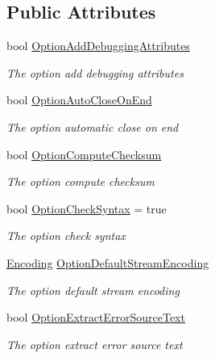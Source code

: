 \subsection*{Public Attributes}
\begin{DoxyCompactItemize}
\item 
bool \hyperlink{class_html_agility_pack_1_1_html_document_a2cf668dcda23a98c29c85163a4358263}{Option\+Add\+Debugging\+Attributes}
\begin{DoxyCompactList}\small\item\em The option add debugging attributes \end{DoxyCompactList}\item 
bool \hyperlink{class_html_agility_pack_1_1_html_document_a40268a813d669a6b004b542840f262c4}{Option\+Auto\+Close\+On\+End}
\begin{DoxyCompactList}\small\item\em The option automatic close on end \end{DoxyCompactList}\item 
bool \hyperlink{class_html_agility_pack_1_1_html_document_aacb32b5d47df749144ec6a59641ae148}{Option\+Compute\+Checksum}
\begin{DoxyCompactList}\small\item\em The option compute checksum \end{DoxyCompactList}\item 
bool \hyperlink{class_html_agility_pack_1_1_html_document_ae5f05b3668d070d9e69c4be19be4b3fc}{Option\+Check\+Syntax} = true
\begin{DoxyCompactList}\small\item\em The option check syntax \end{DoxyCompactList}\item 
\hyperlink{class_html_agility_pack_1_1_html_document_a220bdf28a5e35f4898075084be2d59f0}{Encoding} \hyperlink{class_html_agility_pack_1_1_html_document_a749c038f46ef4979f5a97c3c8e204f85}{Option\+Default\+Stream\+Encoding}
\begin{DoxyCompactList}\small\item\em The option default stream encoding \end{DoxyCompactList}\item 
bool \hyperlink{class_html_agility_pack_1_1_html_document_a504adb7f84929e373ef8cfde73e80734}{Option\+Extract\+Error\+Source\+Text}
\begin{DoxyCompactList}\small\item\em The option extract error source text \end{DoxyCompactList}\item 

\end{DoxyCompactItemize}
